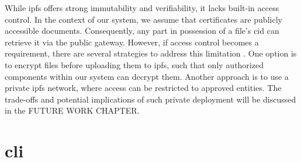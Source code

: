 While \acrshort{ipfs} offers strong immutability and verifiability, it lacks built-in access control. In the context of our system, we assume that certificates are publicly accessible documents. Consequently, any part in possession of a file's \acrshort{cid} can retrieve it via the public gateway. However, if access control becomes a requirement, there are several strategies to address this limitation \cite{barbaraanrealaura2021datapersistence}. One option is to encrypt files before uploading them to \acrshort{ipfs}, such that only authorized components within our system can decrypt them. Another approach is to use a private \acrshort{ipfs} network, where access can be restricted to approved entities. The trade-offs and potential implications of such private deployment will be discussed in the FUTURE WORK CHAPTER.

\section{\acrshort{cli}}
\label{sec:cliDesign}